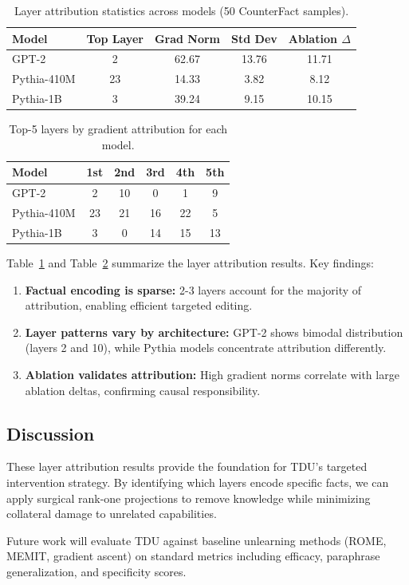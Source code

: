 \begin{table}[t]
\centering
\caption{Layer attribution statistics across models (50 CounterFact samples).}
\label{tab:layer_stats}
\begin{tabular}{@{}lcccc@{}}
\toprule
\textbf{Model} & \textbf{Top Layer} & \textbf{Grad Norm} & \textbf{Std Dev} & \textbf{Ablation $\Delta$} \\
\midrule
GPT-2 & 2 & 62.67 & 13.76 & 11.71 \\
Pythia-410M & 23 & 14.33 & 3.82 & 8.12 \\
Pythia-1B & 3 & 39.24 & 9.15 & 10.15 \\
\bottomrule
\end{tabular}
\end{table}

\begin{table}[t]
\centering
\caption{Top-5 layers by gradient attribution for each model.}
\label{tab:top_layers}
\begin{tabular}{@{}lccccc@{}}
\toprule
\textbf{Model} & \textbf{1st} & \textbf{2nd} & \textbf{3rd} & \textbf{4th} & \textbf{5th} \\
\midrule
GPT-2 & 2 & 10 & 0 & 1 & 9 \\
Pythia-410M & 23 & 21 & 16 & 22 & 5 \\
Pythia-1B & 3 & 0 & 14 & 15 & 13 \\
\bottomrule
\end{tabular}
\end{table}

Table~\ref{tab:layer_stats} and Table~\ref{tab:top_layers} summarize the layer attribution results. Key findings:

\begin{enumerate}
    \item \textbf{Factual encoding is sparse:} 2-3 layers account for the majority of attribution, enabling efficient targeted editing.
    
    \item \textbf{Layer patterns vary by architecture:} GPT-2 shows bimodal distribution (layers 2 and 10), while Pythia models concentrate attribution differently.
    
    \item \textbf{Ablation validates attribution:} High gradient norms correlate with large ablation deltas, confirming causal responsibility.
\end{enumerate}

\subsection{Discussion}

These layer attribution results provide the foundation for TDU's targeted intervention strategy. By identifying which layers encode specific facts, we can apply surgical rank-one projections to remove knowledge while minimizing collateral damage to unrelated capabilities.

Future work will evaluate TDU against baseline unlearning methods (ROME, MEMIT, gradient ascent) on standard metrics including efficacy, paraphrase generalization, and specificity scores.
